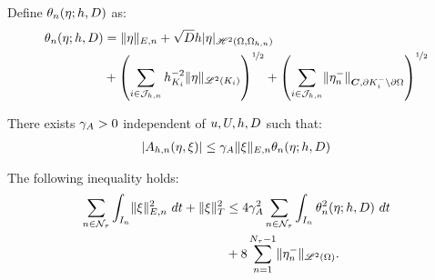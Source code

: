 \begin{definition} \label{def:theta}
    Define $\theta_n(\eta; h, D)$ as:
    \begin{align} %
        \theta_n(\eta; h, \Diffusion) &= \lVert \eta \rVert_{E, n} + \sqrt{\Diffusion} h \lvert \eta \rvert_{\SpaceHk{2}(\Omega, \Omega_{h, n})} \\
        &+ \left( \sum_{i \in \SpaceTimeIndices} h_{K_i}^{-2} \lVert \eta \rVert_{\SpaceLp{2}(K_i)} \right)^{\nicefrac12} + \left( \sum_{i \in \SpaceTimeIndices} \lVert \eta_n^- \rVert_{\Convection, \partial K_i^- \setminus \partial \Omega} \right)^{\nicefrac12}
    \end{align}
\end{definition}

\begin{lemma}
    There exists $\gamma_{A} > 0$ independent of $u, U, h, D$ such that:
    \begin{align}
        \lvert A_{h, n}(\eta, \xi) \rvert \leq \gamma_{A} \lVert \xi \rVert_{E, n} \theta_n(\eta; h, D)
    \end{align}
\end{lemma}

\begin{lemma}
    The following inequality holds:
    \begin{align}
        \sum_{n \in \mathcal{N}_{\tau}} \int_{I_n} \lVert \xi \rVert_{E, n}^2 ~ dt + \lVert \xi \rVert_T^2 &\leq 4 \gamma_{A}^2 \sum_{n \in \mathcal{N}_{\tau}} \int_{I_n} \theta_n^2(\eta; h, D) ~ dt \\
        &+ 8 \sum_{n = 1}^{N_{\tau} - 1} \lVert \eta_n^- \rVert_{\mathscr{L}^{2}(\Omega)}. \notag
    \end{align}
\end{lemma}


